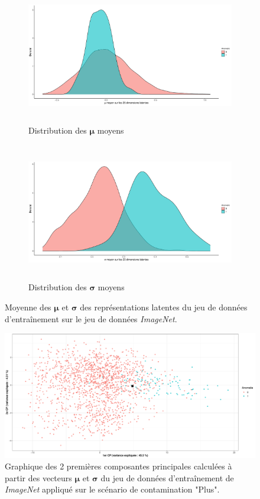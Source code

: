 \begin{figure}[H]
	\centering
	\begin{subfigure}{12cm}
		\centering\includegraphics[width=12cm, height=6cm]{images/latent_stats/plot_mu}
		\caption{Distribution des $\boldsymbol{\mu}$ moyens}
	\end{subfigure}
	\begin{subfigure}{12cm}
		\centering\includegraphics[width=12cm, height=6cm]{images/latent_stats/plot_sigma}
		\caption{Distribution des $\boldsymbol{\sigma}$ moyens}
	\end{subfigure}
	\caption{Moyenne des $\boldsymbol{\mu}$ et $\boldsymbol{\sigma}$ des représentations latentes du jeu de données d'entraînement sur le jeu de données \textit{ImageNet}.}
	\label{fig:cars_latent_stats}
\end{figure}

\begin{figure}[htb]
	\centering
	\centering\includegraphics[width=\linewidth]{images/plot_pca_cars}
	\caption{Graphique des 2 premières composantes principales calculées à partir des vecteurs $\boldsymbol{\mu}$ et $\boldsymbol{\sigma}$ du jeu de données d'entraînement de \textit{ImageNet} appliqué sur le scénario de contamination "Plus".}
	\label{fig:pca_cars}
\end{figure}


